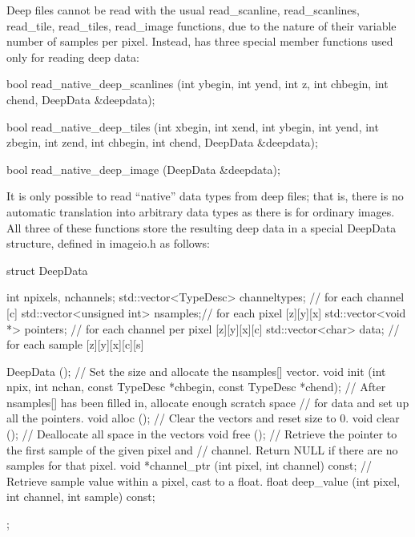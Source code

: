 Deep files cannot be read with the usual {\cf read_scanline}, {\cf
  read_scanlines}, {\cf read_tile}, {\cf read_tiles}, {\cf read_image}
functions, due to the nature of their variable number of samples per
pixel.  Instead, \ImageInput has three special member functions used
only for reading deep data:

\begin{code}
    bool read_native_deep_scanlines (int ybegin, int yend, int z,
                                     int chbegin, int chend,
                                     DeepData &deepdata);

    bool read_native_deep_tiles (int xbegin, int xend, int ybegin, int yend,
                                 int zbegin, int zend,
                                 int chbegin, int chend, DeepData &deepdata);

    bool read_native_deep_image (DeepData &deepdata);
\end{code}

It is only possible to read ``native'' data types from deep files; that
is, there is no automatic translation into arbitrary data types as there
is for ordinary images.  All three of these functions store the
resulting deep data in a special {\cf DeepData} structure, defined in
{\cf imageio.h} as follows:

\begin{code}
    struct DeepData {
        int npixels, nchannels;
        std::vector<TypeDesc> channeltypes;  // for each channel [c]
        std::vector<unsigned int> nsamples;// for each pixel [z][y][x]
        std::vector<void *> pointers;    // for each channel per pixel [z][y][x][c]
        std::vector<char> data;          // for each sample [z][y][x][c][s]

        DeepData ();
        // Set the size and allocate the nsamples[] vector.
        void init (int npix, int nchan,
                   const TypeDesc *chbegin, const TypeDesc *chend);
        // After nsamples[] has been filled in, allocate enough scratch space
        // for data and set up all the pointers.
        void alloc ();
        // Clear the vectors and reset size to 0.
        void clear ();
        // Deallocate all space in the vectors
        void free ();
        // Retrieve the pointer to the first sample of the given pixel and
        // channel. Return NULL if there are no samples for that pixel.
        void *channel_ptr (int pixel, int channel) const;
        // Retrieve sample value within a pixel, cast to a float.
        float deep_value (int pixel, int channel, int sample) const;
    };
\end{code}

